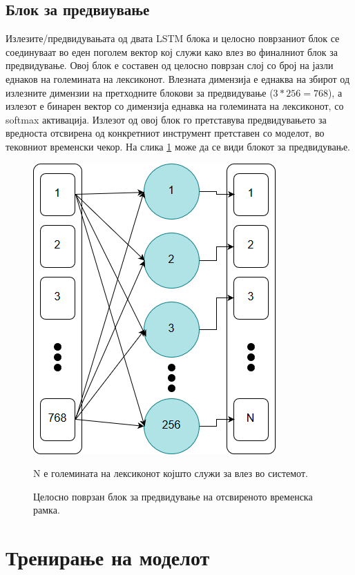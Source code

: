 \subsection{Блок за предвиување}

Излезите/предвидувањата од двата LSTM блока и целосно поврзаниот блок се соединуваат во еден поголем вектор кој служи како влез во финалниот блок за предвидување. Овој блок е составен од целосно поврзан слој со број на јазли еднаков на големината на лексиконот. Влезната димензија е еднаква на збирот од излезните димензии на претходните блокови за предвидување ($3*256=768$), а излезот е бинарен вектор со димензија еднавка на големината на лексиконот, со softmax активација. Излезот од овој блок го претставува предвидувањето за вредноста отсвирена од конкретниот инструмент претставен со моделот, во тековниот временски чекор. На слика \ref{fig:learner} може да се види блокот за предвидување.

\begin{figure}[H]
	\centering
    \includegraphics[scale=0.5]{images/learner.png}
	\caption{Целосно поврзан блок за предвидување на отсвиреното временска рамка.}
	N е големината на лексиконот којшто служи за влез во системот.
	\label{fig:learner}
\end{figure}

\section{Тренирање на моделот}

